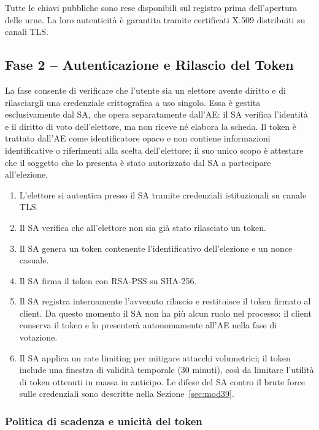 \documentclass[12pt,a4paper]{article}
\begin{document}
Tutte le chiavi pubbliche sono rese disponibili sul registro prima dell'apertura delle urne.
La loro autenticità è garantita tramite certificati X.509 distribuiti su canali TLS.

\subsection{Fase 2 – Autenticazione e Rilascio del Token}

La fase consente di verificare che l'utente sia un elettore avente diritto e di rilasciargli
una credenziale crittografica a uso singolo. Essa è gestita esclusivamente dal SA, che opera
separatamente dall'AE: il SA verifica l'identità e il diritto di voto dell'elettore, ma non
riceve né elabora la scheda. Il token è trattato dall'AE come identificatore opaco e non
contiene informazioni identificative o riferimenti alla scelta dell'elettore; il suo unico
scopo è attestare che il soggetto che lo presenta è stato autorizzato dal SA a partecipare
all'elezione.

\begin{enumerate}
  \item L'elettore si autentica presso il SA tramite credenziali istituzionali su canale TLS.
  \item Il SA verifica che all'elettore non sia già stato rilasciato un token.
  \item Il SA genera un token contenente l'identificativo dell'elezione e un nonce casuale.
  \item Il SA firma il token con RSA-PSS su SHA-256.
  \item Il SA registra internamente l'avvenuto rilascio e restituisce il token firmato al
    client. Da questo momento il SA non ha più alcun ruolo nel processo: il client conserva
    il token e lo presenterà autonomamente all'AE nella fase di votazione.
  \item Il SA applica un rate limiting per mitigare attacchi volumetrici; il token include una
    finestra di validità temporale (30 minuti), così da limitare l'utilità di token ottenuti
    in massa in anticipo. Le difese del SA contro il brute force sulle credenziali sono
    descritte nella Sezione~\ref{sec:mod39}.
\end{enumerate}

\subsubsection{Politica di scadenza e unicità del token}
\end{document}
